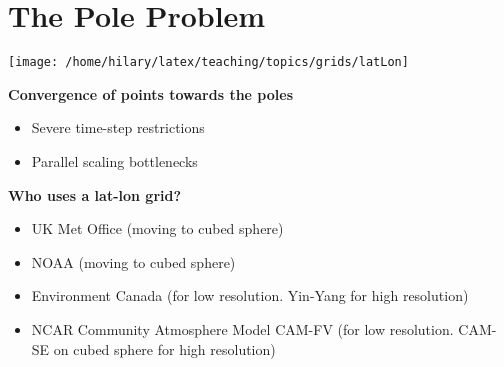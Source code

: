 \clearpage{}

\begin{minipage}[t]{0.4\columnwidth}%

\section{The Pole Problem}

\texttt{[image: /home/hilary/latex/teaching/topics/grids/latLon]}%
\end{minipage}\hfill{}%
\begin{minipage}[t]{0.55\columnwidth}%
\textbf{Convergence of points towards the poles}
\begin{itemize}
\item Severe time-step restrictions
\item Parallel scaling bottlenecks
\end{itemize}
\bigskip{}

\textbf{Who uses a lat-lon grid?}
\begin{itemize}
\item UK Met Office (moving to cubed sphere)
\item NOAA (moving to cubed sphere)
\item Environment Canada (for low resolution. Yin-Yang for high resolution)
\item NCAR Community Atmosphere Model CAM-FV (for low resolution. CAM-SE
on cubed sphere for high resolution)
\end{itemize}
%
\end{minipage}

\clearpage{}

